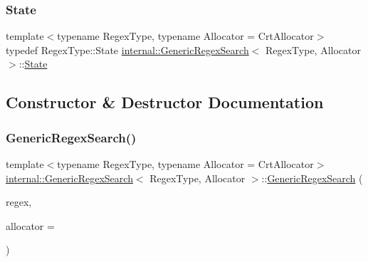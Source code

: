 \mbox{\label{classinternal_1_1GenericRegexSearch_a0586261735313d8cf20042e50ee75c92}} 
\subsubsection{\texorpdfstring{State}{State}}
{\footnotesize\ttfamily template$<$typename Regex\+Type, typename Allocator = Crt\+Allocator$>$ \\
typedef Regex\+Type\+::\+State \hyperlink{classinternal_1_1GenericRegexSearch}{internal\+::\+Generic\+Regex\+Search}$<$ Regex\+Type, Allocator $>$\+::\hyperlink{classinternal_1_1GenericRegexSearch_a0586261735313d8cf20042e50ee75c92}{State}\hspace{0.3cm}{\ttfamily [private]}}



\subsection{Constructor \& Destructor Documentation}
\mbox{\label{classinternal_1_1GenericRegexSearch_a72f70e210a4bc944dba62655a008750b}} 
\subsubsection{\texorpdfstring{Generic\+Regex\+Search()}{GenericRegexSearch()}}
{\footnotesize\ttfamily template$<$typename Regex\+Type, typename Allocator = Crt\+Allocator$>$ \\
\hyperlink{classinternal_1_1GenericRegexSearch}{internal\+::\+Generic\+Regex\+Search}$<$ Regex\+Type, Allocator $>$\+::\hyperlink{classinternal_1_1GenericRegexSearch}{Generic\+Regex\+Search} (\begin{DoxyParamCaption}\item[{const Regex\+Type \&}]{regex,  }\item[{Allocator $\ast$}]{allocator = {} }\end{DoxyParamCaption})\hspace{0.3cm}{\ttfamily [inline]}}


